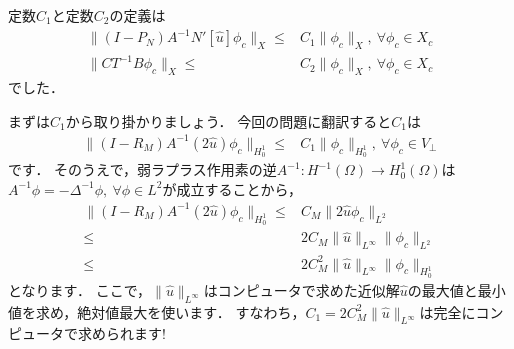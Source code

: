 定数$C_1$と定数$C_2$の定義は
\begin{align*}
	\| (I - P_N) A^{-1} N'[\hat{u}] \phi_c \|_{X} \le& C_1 \| \phi_c \|_{X}, ~ \forall \phi_c \in X_c \\
	\| CT^{-1}B \phi_c \|_{X} \le& C_2 \| \phi_c \|_{X}, ~ \forall \phi_c \in X_c
\end{align*}
でした．

まずは$C_1$から取り掛かりましょう．
今回の問題に翻訳すると$C_1$は
\begin{align*}
	\| (I - R_M) A^{-1} (2\hat{u}) \phi_c \|_{H^1_0} \le& C_1 \| \phi_c \|_{H^1_0}, ~ \forall \phi_c \in V_{\bot}
\end{align*}
です．
そのうえで，弱ラプラス作用素の逆$A^{-1}: H^{-1}(\Omega) \rightarrow H^1_0(\Omega)$は$A^{-1} \phi = -\Delta^{-1} \phi, ~ \forall \phi \in L^2$が成立することから，
\begin{align*}
	\| (I - R_M) A^{-1} (2\hat{u}) \phi_c \|_{H^1_0} \le& C_M \| 2\hat{u} \phi_c \|_{L^2} \\
	\le& 2 C_M \| \hat{u} \|_{L^\infty} \| \phi_c \|_{L^2} \\
	\le& 2 C_M^2 \| \hat{u} \|_{L^\infty} \| \phi_c \|_{H^1_0}
\end{align*}
となります．
ここで，$\| \hat{u} \|_{L^\infty}$はコンピュータで求めた近似解$\hat{u}$の最大値と最小値を求め，絶対値最大を使います．
すなわち，$C_1 = 2 C_M^2 \| \hat{u} \|_{L^\infty}$は完全にコンピュータで求められます!

